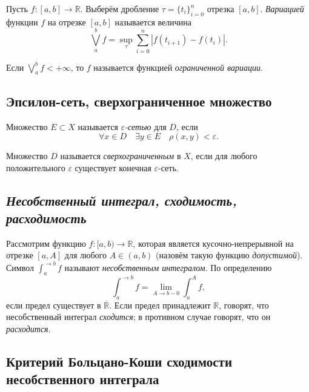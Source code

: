 \begin{definition}
	Пусть \(f \colon [a, b] \to \mathbb{R}\). Выберём дробление \(\tau = \{t_i\}_{i = 0}^n\) отрезка \([a, b]\). \textit{Вариацией}  функции \(f\) на отрезке \([a, b]\) называется величина \[
		\bigvee_a^b f = \sup_\tau \sum_{i = 0}^n |f(t_{i + 1}) - f(t_i)|.
	\]
\end{definition}

\begin{remark}
	Если \(\bigvee\limits_a^b f < +\infty\), то \(f\) называется функцией \textit{ограниченной вариации}.
\end{remark}

\subsection{Эпсилон-сеть, сверхограниченное множество}

\begin{definition}
	Множество \(E \subset X\) называется \textit{\(\varepsilon\)-сетью} для \(D\), если \[
		\forall x \in D \quad \exists y \in E \quad \rho(x, y) < \varepsilon.
	\]
\end{definition}

\begin{definition}
	Множество \(D\) называется \textit{сверхограниченным} в \(X\), если для любого положительного \(\varepsilon\) существует конечная \(\varepsilon\)-сеть.
\end{definition}

\subsection{\itshape Несобственный интеграл, сходимость, расходимость}

\begin{definition}
	Рассмотрим функцию \(f \colon [a, b) \to \mathbb{R}\), которая является кусочно-непрерывной на отрезке \([a, A]\) для любого \(A \in (a, b)\) (назовём такую функцию \textit{допустимой}). Символ \(\int_a^{\to b} f\) называют \textit{несобственным интегралом}. По определению \[
		\int_a^{\to b} f = \lim_{A \to b - 0} \int_a^A f,
	\]
	если предел существует в \(\overline{\mathbb{R}}\). Если предел принадлежит \(\mathbb{R}\), говорят, что несобственный интеграл \textit{сходится}; в противном случае говорят, что он \textit{расходится}.
\end{definition}

\subsection{Критерий Больцано-Коши сходимости несобственного интеграла}

